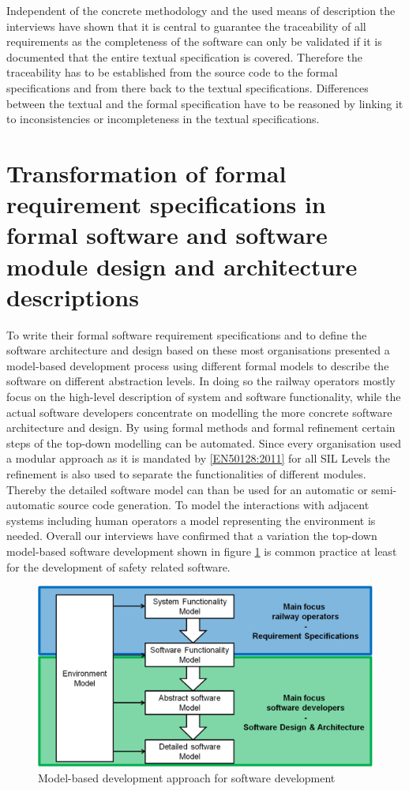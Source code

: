 \documentclass{./template/openetcs_report}
\begin{document}
Independent of the concrete methodology and the used means of description the interviews have shown that it is central to guarantee the traceability of all requirements as the completeness of the software can only be validated if it is documented that the entire textual specification is covered. Therefore the traceability has to be established from the source code to the formal specifications and from there back to the textual specifications. Differences between the textual and the formal specification have to be reasoned by linking it to  inconsistencies or incompleteness in the textual specifications. 


\section{Transformation of formal requirement specifications in formal software and software module design and architecture descriptions}

To write their formal software requirement specifications and to define the software architecture and design based on these most organisations presented a model-based development process using different formal models to describe the software on different abstraction levels. In doing so the railway operators mostly focus on the high-level description of system and software functionality, while the actual software developers concentrate on modelling the more concrete software architecture and design. By using formal methods and formal refinement certain steps of the top-down modelling can be automated. Since every organisation used a modular approach as it is mandated by \ref{EN50128:2011} for all SIL Levels the refinement is also used to separate the functionalities of different modules. Thereby the detailed software model can than be used for an automatic or semi-automatic source code generation. To model the interactions with adjacent systems including human operators a model representing the environment is needed. Overall our interviews have confirmed that a variation the top-down model-based software development shown in figure \ref{fig: MBD} is common practice at least for the development of safety related software. 

\begin{figure}[h]
\centering
\includegraphics[scale=0.6]{Model-based_Approach.png}
\caption{Model-based development approach for software development}
\label{fig: MBD}
\end{figure}
\end{document}
